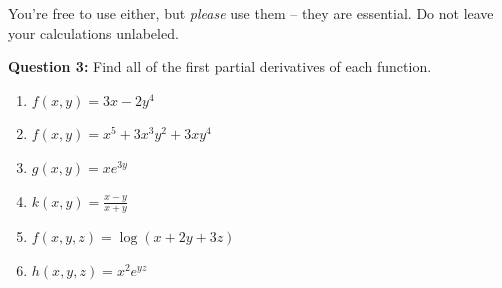 \documentclass[10pt]{amsart}
\begin{document}
You're free to use either, but {\it please} use them -- they are essential. Do not leave your calculations unlabeled.

\textbf{Question 3:} Find all of the first partial derivatives of each function.

\begin{enumerate}
\item $f(x,y) = 3x - 2y^4$

\item $f(x,y) = x^5 + 3x^3y^2 + 3xy^4$

\item $g(x,y) = xe^{3y}$

\item $k(x,y) = \frac{x-y}{x+y}$

\item $f(x,y,z) = \log(x+2y+3z)$

\item $h(x,y,z) = x^2 e^{yz}$
\end{enumerate}
\end{document}
